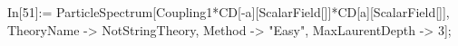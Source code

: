 In[51]:= ParticleSpectrum[Coupling1*CD[-a][ScalarField[]]*CD[a][ScalarField[]], TheoryName -> NotStringTheory, Method -> "Easy", MaxLaurentDepth -> 3]; 